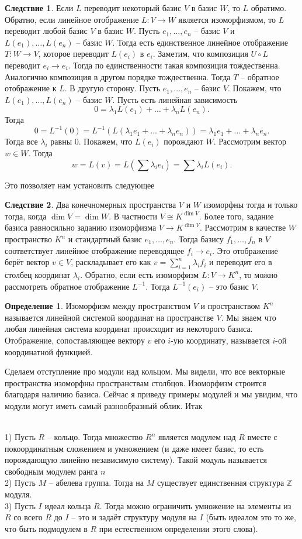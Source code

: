 \documentclass[10pt,a4paper,oneside]{book} %
\theoremstyle{definition}
\newtheorem*{defn}{Определение}
\newtheorem{cor}{Следствие}
\newcommand{\mb}[1]{\mathbb{#1}}
\def\exm{\noindent {\bf Примеры:}}
\def\dfn{\begin{defn}}
\def\edfn{\end{defn}}
\def\crl{\begin{cor}}
\def\ecrl{\end{cor}}
\begin{document}
\crl Если $L$ переводит некоторый базис $V$ в базис $W$, то $L$ обратимо. Обратно, если линейное отображение $L \colon V \to W$ является изоморфизмом, то $L$ переводит любой базис $V$ в базис $W$.
\proof
Пусть $e_1,\dots,e_n$ -- базис $V$ и $L(e_1),\dots,L(e_n)$ -- базис $W$. Тогда есть единственное линейное отображение $T \colon W \to V$, которое переводит $L(e_i)$ в $e_i$. Заметим, что композиция $U\circ L$ переводит $e_i \to e_i$. Тогда по единственности такая композиция тождественна. Аналогично композиция в другом порядке тождественна. Тогда $T$ -- обратное отображение к $L$.
 В другую сторону. Пусть $e_1,\dots,e_n$ -- базис $V$. Покажем, что $L(e_1),\dots,L(e_n)$ -- базис $W$.  Пусть есть линейная зависимость  $$0=\lambda_1 L(e_1)+\dots+\lambda_n L(e_n).$$
Тогда
$$0=L^{-1}(0)=L^{-1}(L(\lambda_1 e_1+\dots+\lambda_n e_n))=\lambda_1 e_1+\dots+\lambda_n e_n.$$
Тогда все $\lambda_i$ равны 0. Покажем, что $L(e_i)$ порождают $W$. Рассмотрим вектор $w\in W$. Тогда $$w=L(v)=L\left(\sum \lambda_i e_i\right)=\sum \lambda_i L(e_i).$$
\endproof
\ecrl

Это позволяет нам установить следующее

\crl Два конечномерных пространства $V$ и $W$ изоморфны тогда и только тогда, когда $\dim V=\dim W$. В частности $V\cong K^{\dim V}$. Более того, задание базиса равносильно заданию изоморфизма $V\to K^{\dim V}$.
\proof
Рассмотрим в качестве $W$ пространство $K^n$ и стандартный базис $e_1,\dots,e_n$. Тогда базису $f_1,\dots,f_n$ в $V$ соответствует линейное отображение переводящее $f_i \to e_i$. Это отображение берёт вектор $v \in V$, раскладывает его как $v=\sum_{i=1}^n \lambda_i f_i$ и переводит его в столбец координат $\lambda_i$. Обратно, если есть изоморфизм $L\colon V \to K^n$, то можно рассмотреть обратное отображение $L^{-1}$. Тогда $L^{-1}(e_i)$ -- это базис $V$.
\endproof
\ecrl

\dfn
Изоморфизм между пространством $V$ и пространством $K^n$ называется линейной системой координат на пространстве $V$. Мы знаем что любая линейная система координат происходит из некоторого базиса. Отображение, сопоставляющее вектору $v$ его $i$-ую координату, называется $i$-ой координатной функцией.
\edfn

Сделаем отступление про модули над кольцом. Мы видели, что все векторные пространства изоморфны пространствам столбцов. Изоморфизм строится благодаря наличию базиса.
Сейчас я приведу примеры модулей и мы увидим, что модули могут иметь самый разнообразный облик. Итак


\exm\\
1) Пусть $R$ -- кольцо. Тогда множество $R^n$ является модулем над $R$ вместе с покоординатным сложением и умножением (и даже имеет базис, то есть порождающую линейно независимую систему). Такой модуль называется свободным модулем ранга $n$\\
2) Пусть $M$ -- абелева группа. Тогда на $M$ существует единственная структура $\mb Z$ модуля.\\
3) Пусть $I$ идеал кольца $R$. Тогда можно ограничить умножение на элементы из $R$ со всего $R$ до  $I$ -- это и задаёт структуру модуля на $I$ (быть идеалом это то же, что быть подмодулем в $R$ при естественном определении этого слова).
\end{document}
